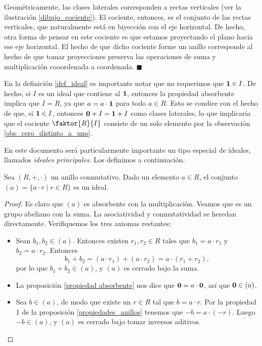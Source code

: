\begin{example}
Geométricamente, las clases laterales corresponden a rectas verticales (ver la ilustración \ref{dibujo_cociente}). El cociente, entonces, es el conjunto de las rectas verticales, que naturalmente está en biyección con el eje horizontal. De hecho, otra forma de pensar en este cociente es que estamos proyectando el plano hacia ese eje horizontal. El hecho de que dicho cociente forme un anillo corresponde al hecho de que tomar proyecciones preserva las operaciones de suma y multiplicación cooordenada a coordenada.
\hfill$\blacksquare$
\end{example}

\begin{remark}
En la definición \ref{def_ideal} es importante notar que no requerimos que $\mathbf{1} \in I$. De hecho, si $I$ es un ideal que contiene al $\mathbf{1}$, entonces la propiedad absorbente implica que $I = R$, ya que $a = a \cdot \mathbf{1}$ para todo $a \in R$. Esto se condice con el hecho de que, si $\mathbf{1} \in I$, entonces $\mathbf{0} + I = \mathbf{1} + I$ como clases laterales, lo que implicaría que el cociente $\faktor{R}{I}$ consiste de un solo elemento por la observación \ref{obs_cero_distinto_a_uno}.
\end{remark}

En este documento será particularmente importante un tipo especial de ideales, llamados \emph{ideales principales}. Los definimos a continuación.

\begin{prop} \label{def_ideal_principal}
Sea $(R, +, \cdot)$ un anillo conmutativo. Dado un elemento $a \in R$, el conjunto $(a) = \{a \cdot r \mid r \in R\}$ es un ideal.
\end{prop}

\begin{proof}
Es claro que $(a)$ es absorbente con la multiplicación. Veamos que es un grupo abeliano con la suma. La asociatividad y conmutatividad se heredan directamente. Verifiquemos los tres axiomas restantes:
\begin{itemize}
\item Sean $b_1, b_2 \in (a)$. Entonces existen $r_1, r_2 \in R$ tales que $b_1 = a \cdot r_1$ y $b_2 = a \cdot r_2$. Entonces
$$b_1 + b_2 = (a \cdot r_1) + (a \cdot r_2) = a \cdot (r_1 + r_2),$$
por lo que $b_1 + b_2 \in (a)$, y $(a)$ es cerrado bajo la suma.
\item La proposición \ref{propiedad absorbente} nos dice que $\mathbf{0} = a \cdot \mathbf{0}$, así que $\mathbf{0} \in (a)$.
\item Sea $b \in (a)$, de modo que existe un $r \in R$ tal que $b = a \cdot r$. Por la propiedad 1 de la proposición \ref{propiedades_anillos} tenemos que $-b = a \cdot (-r)$. Luego $-b \in (a)$, y $(a)$ es cerrado bajo tomar inversos aditivos.
\end{itemize} 
\end{proof}

